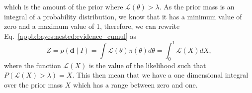 which is the amount of the prior where $\mathcal{L}(\theta) >
\lambda$.
As the prior mass is an integral of a probability distribution, we
know that it has a minimum value of zero and a maximum value of 1,
therefore, we can rewrite
Eq.~\ref{appb:bayes:nested:evidence_cumul} as
\begin{equation}
  \label{appb:bayes:nested:evidence}
  Z = p(\bm{d} \mid I) = \int \mathcal{L}(\theta) \pi(\theta) d\theta
  = \int_0^1 \mathcal{L}(X) dX,
\end{equation}
where the function $\mathcal{L}(X)$ is the value of the likelihood
such that $P(\mathcal{L}(X) > \lambda) = X$.
This then mean that we have a one dimensional integral over the prior
mass $X$ which has a range between zero and one.







